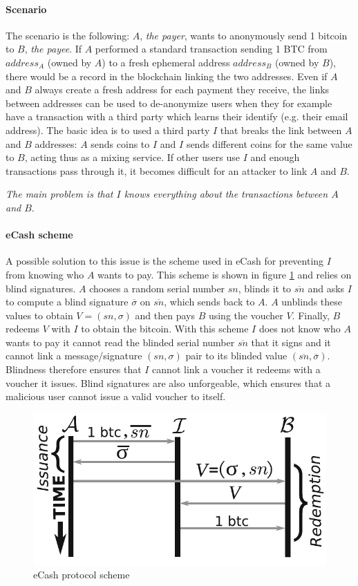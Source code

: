 \paragraph{Scenario}
The scenario is the following: $A$, \emph{the payer}, wants to anonymously send
1 bitcoin to $B$, \emph{the  payee}. If $A$ performed a standard transaction
sending 1 BTC from $address_A$ (owned by $A$) to a fresh ephemeral address
$address_B$ (owned by $B$), there would be a record in the blockchain linking
the two addresses. Even if $A$ and $B$ always create a fresh address for each
payment they receive, the links between addresses can be used to de-anonymize
users when they for example have a transaction with a third party which learns
their identify (e.g. their email address). The basic idea is to used a third
party $I$ that breaks the link between $A$ and $B$ addresses: $A$ sends coins to
$I$ and $I$ sends different coins for the same value to $B$, acting thus as a
mixing service. If other users use $I$ and enough transactions pass through it,
it becomes difficult for an attacker to link $A$ and $B$.

\emph{The main problem is that $I$ knows everything about the transactions between
$A$ and $B$}.

\paragraph{eCash scheme}
A possible solution to this issue is the scheme used in eCash for preventing $I$
from knowing who $A$ wants to pay. This scheme is shown in figure
\ref{fig:eCash-scheme} and relies on blind signatures. $A$ chooses a random
serial number $sn$, blinds it to $\overline{sn}$ and asks $I$ to compute a blind
signature $\overline\sigma$ on $\overline{sn}$, which sends back to $A$. $A$
unblinds these values to obtain $V = (sn, \sigma)$ and then pays $B$ using the
voucher $V$. Finally, $B$ redeems $V$ with $I$ to obtain the bitcoin. With this
scheme $I$ does not know who $A$ wants to pay it cannot read the blinded serial
number $\overline{sn}$ that it signs and it cannot link a message/signature
$(sn, \sigma)$ pair to its blinded value $(\overline{sn}, \overline\sigma)$.
Blindness therefore ensures that $I$ cannot link a voucher it redeems with a
voucher it issues. Blind signatures are also unforgeable, which ensures that a
malicious user cannot issue a valid voucher to itself.
\begin{figure}[!htb]
	\centering
	\includegraphics[width=0.6\linewidth]{img/eCash-scheme.png}
	\caption{eCash protocol scheme}
	\label{fig:eCash-scheme}
\end{figure}

